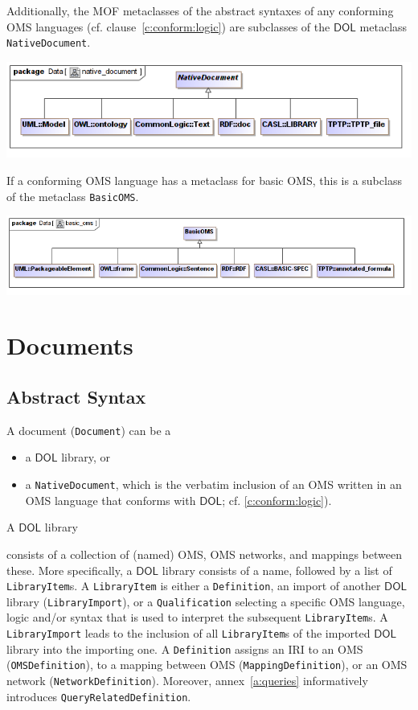 \documentclass[10pt,fleqn,final]{scrreprt}
\makeatletter
\newcommand*{\cf}{cf.\@\xspace}
\newcommand*{\termref}[1]{\index{#1}#1\xspace}
\newcommand*{\syntax}[1]{\texttt{#1}}
\newcommand*{\DOL}{\ensuremath{\mathsf{DOL}}\xspace}
\newcommand{\clauserefname}{clause}
\newcommand{\cref}[1]{\clauserefname~\ref{#1}}
\newcommand{\sclause}[1]{\section{#1}}
\newcommand{\ssclause}[1]{\subsection{#1}}
\newenvironment{definitions}[0]{\medskip }{}
\makeatother
\begin{document}
\begin{definitions}
Additionally, the  MOF metaclasses  of the abstract syntaxes
of any conforming OMS languages (\cf \cref{c:conform:logic})  are
subclasses of the \DOL metaclass \syntax{NativeDocument}.

\medskip
\begin{center}
\includegraphics[scale=0.47]{mof/native_document.png}
\end{center}

If a conforming OMS language has a metaclass for basic OMS,
this is a subclass of the metaclass \syntax{BasicOMS}.

\medskip
\begin{center}
\includegraphics[scale=0.47]{mof/basic_oms.png}
\end{center}





\sclause{Documents}\label{c:libraries}
\ssclause{Abstract Syntax}


A \termref{document} (\syntax{Document}) can be a 
\begin{itemize}
\item a \DOL library, or
\item a \syntax{NativeDocument}, which is the verbatim inclusion of an
  OMS written in an OMS language that conforms with \DOL; \cf
  \ref{c:conform:logic}).
\end{itemize}
A \DOL library 

 consists of a collection of (named)  OMS,  OMS networks, and mappings between these.  More specifically, a \DOL
library consists of a name, followed by a list of
\syntax{LibraryItem}s.  A \syntax{LibraryItem} is either a
\syntax{Definition},
an import of another \DOL library (\syntax{LibraryImport}),
or a \syntax{Qualification} selecting a specific
OMS language, logic and/or syntax that is used to interpret the
subsequent \syntax{LibraryItem}s.  
 A \syntax{LibraryImport} leads to the inclusion of all \syntax{LibraryItem}s of the imported \DOL library into the importing one.
A \syntax{Definition} assigns an IRI to an OMS  (\syntax{OMSDefinition}), 
to a mapping between OMS (\syntax{MappingDefinition}), or
an OMS network  (\syntax{NetworkDefinition}). Moreover, annex~\ref{a:queries}
informatively introduces \syntax{QueryRelatedDefinition}.


\end{definitions}
\end{document}
